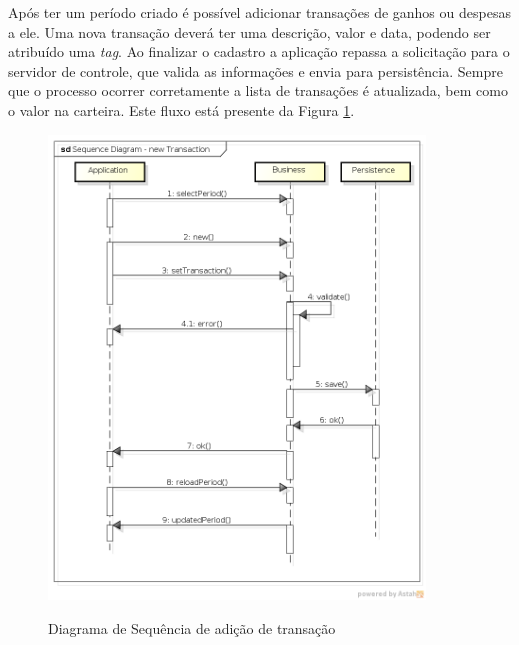	Após ter um período criado é possível adicionar transações de ganhos ou despesas a ele. Uma nova transação deverá ter uma descrição, valor e data, podendo ser atribuído uma \textit{tag}. Ao finalizar o cadastro a aplicação repassa a solicitação para o servidor de controle, que valida as informações e envia para persistência. Sempre que o processo ocorrer corretamente a lista de transações é atualizada, bem como o valor na carteira. Este fluxo está presente da Figura \ref{SeqTransaction}.
	
	\begin{figure}[!htb]
		\caption{Diagrama de Sequência de adição de transação}
		{\parbox{6cm}{
				\includegraphics[width=10cm]{images/SequenceDiagramNewTransaction.png}
				\label{SeqTransaction}
		}}
	\end{figure}
